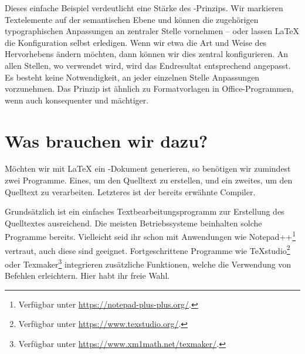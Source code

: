 Dieses einfache Beispiel verdeutlicht eine Stärke des -Prinzips. 
Wir markieren Textelemente auf der semantischen Ebene und können die zugehörigen typographischen Anpassungen an zentraler Stelle vornehmen -- oder lassen \LaTeX{} die Konfiguration selbst erledigen.
Wenn wir etwa die Art und Weise des Hervorhebens ändern möchten, dann können wir dies zentral konfigurieren. An allen Stellen, wo \texttt{\emph{}} verwendet wird, wird das Endresultat entsprechend angepasst. Es besteht keine Notwendigkeit, an jeder einzelnen Stelle Anpassungen vorzunehmen. Das Prinzip ist ähnlich zu Formatvorlagen in Office-Programmen, wenn auch konsequenter und mächtiger. 


\section{Was brauchen wir dazu?}
\label{subsec:what-we-need}

Möchten wir mit \LaTeX{} ein -Dokument generieren, so benötigen wir zumindest zwei Programme. Eines, um den Quelltext zu erstellen, und ein zweites, um den Quelltext zu verarbeiten. Letzteres ist der bereits erwähnte Compiler.

Grundsätzlich ist ein einfaches Textbearbeitungsprogramm zur Erstellung des Quelltextes ausreichend. Die meisten Betriebssysteme beinhalten solche Programme bereits. Vielleicht seid ihr schon mit Anwendungen wie Notepad++\footnote{Verfügbar unter \url{https://notepad-plus-plus.org/}.} vertraut, auch diese sind geeignet.
Fortgeschrittene Programme wie TeXstudio\footnote{Verfügbar unter \url{https://www.texstudio.org/}.} oder Texmaker\footnote{Verfügbar unter \url{https://www.xm1math.net/texmaker/}.} integrieren zusätzliche Funktionen, welche die Verwendung von Befehlen erleichtern. Hier habt ihr freie Wahl.

